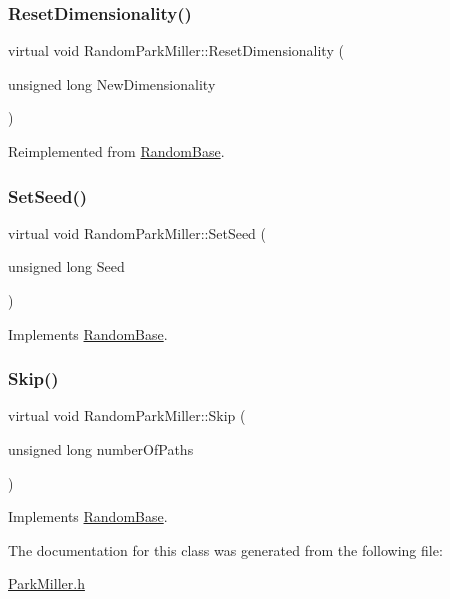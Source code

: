 \subsubsection{\texorpdfstring{Reset\+Dimensionality()}{ResetDimensionality()}}
{\footnotesize\ttfamily virtual void Random\+Park\+Miller\+::\+Reset\+Dimensionality (\begin{DoxyParamCaption}\item[{unsigned long}]{New\+Dimensionality }\end{DoxyParamCaption})\hspace{0.3cm}{\ttfamily [virtual]}}



Reimplemented from \hyperlink{classRandomBase_a8931e429ae130ea44af5469dc6ae728f}{Random\+Base}.

\hypertarget{classRandomParkMiller_aff4bf7d5efe1b695c88372ff9f9fa46e}{}\label{classRandomParkMiller_aff4bf7d5efe1b695c88372ff9f9fa46e} 
\subsubsection{\texorpdfstring{Set\+Seed()}{SetSeed()}}
{\footnotesize\ttfamily virtual void Random\+Park\+Miller\+::\+Set\+Seed (\begin{DoxyParamCaption}\item[{unsigned long}]{Seed }\end{DoxyParamCaption})\hspace{0.3cm}{\ttfamily [virtual]}}



Implements \hyperlink{classRandomBase_ae93f26c38d1675ef07cb1fd29b894b26}{Random\+Base}.

\hypertarget{classRandomParkMiller_a5a72cd434c23c8f79898b5fb5c455208}{}\label{classRandomParkMiller_a5a72cd434c23c8f79898b5fb5c455208} 
\subsubsection{\texorpdfstring{Skip()}{Skip()}}
{\footnotesize\ttfamily virtual void Random\+Park\+Miller\+::\+Skip (\begin{DoxyParamCaption}\item[{unsigned long}]{number\+Of\+Paths }\end{DoxyParamCaption})\hspace{0.3cm}{\ttfamily [virtual]}}



Implements \hyperlink{classRandomBase_a0531f44e3e2a71d14ef1490aa5d90b77}{Random\+Base}.



The documentation for this class was generated from the following file\+:\begin{DoxyCompactItemize}
\item 
\hyperlink{ParkMiller_8h}{Park\+Miller.\+h}\end{DoxyCompactItemize}
